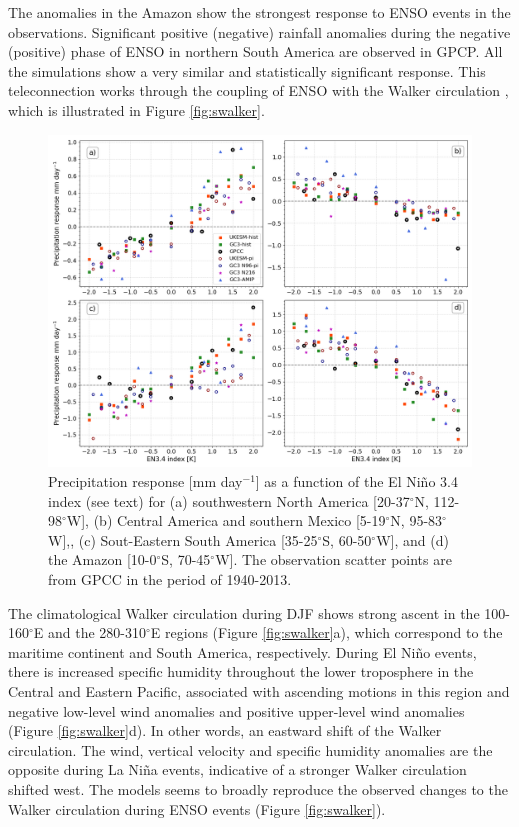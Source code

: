 The anomalies in the Amazon show the strongest response to ENSO events in the observations. Significant positive (negative) rainfall anomalies during the negative (positive) phase of ENSO in northern South America are observed in GPCP. All the simulations show a very similar and statistically significant response. This teleconnection works through the coupling of ENSO with the Walker circulation \citep{vera2006,cai2019pantropical}, which is illustrated in Figure \ref{fig:swalker}. 

\begin{figure}[t!]
\centering
 \includegraphics[width=\linewidth]{figures/fig_ensolinear}
\caption[Linearity of the precipitation response to ENSO events]{Precipitation response [mm day$^{-1}$] as a function of the El Ni\~no 3.4 index (see text) for (a) southwestern North America [20-37$^\circ$N, 112-98$^\circ$W], (b) Central America and southern Mexico [5-19$^\circ$N, 95-83$^\circ$W],, (c) Sout-Eastern South America [35-25$^\circ$S, 60-50$^\circ$W], and (d) the Amazon [10-0$^\circ$S, 70-45$^\circ$W]. The observation scatter points are from GPCC in the period of 1940-2013.}
\label{fig:12}
\end{figure}

The climatological Walker circulation during DJF shows strong ascent in the 100-160$^\circ$E and the 280-310$^\circ$E regions (Figure \ref{fig:swalker}a), which correspond to the maritime continent and South America, respectively. During El Ni\~no events, there is increased specific humidity throughout the lower troposphere in the Central and Eastern Pacific, associated with ascending motions in this region and negative low-level wind anomalies and positive upper-level wind anomalies (Figure \ref{fig:swalker}d). In other words, an eastward shift of the Walker circulation. The wind, vertical velocity and specific humidity anomalies are the opposite during La Niña events, indicative of a stronger Walker circulation shifted west. 
The models seems to broadly reproduce the observed changes to the Walker circulation during ENSO events (Figure \ref{fig:swalker}).

